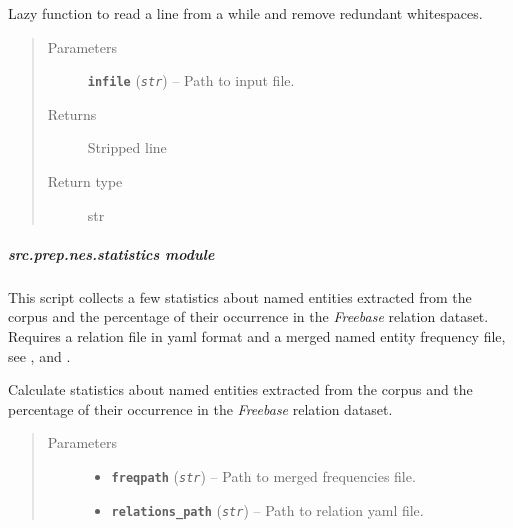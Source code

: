 \documentclass[letterpaper,10pt,english]{sphinxmanual}
\begin{document}

\begin{fulllineitems}
\label{src.prep.nes:src.prep.nes.merge.rl}
Lazy function to read a line from a while and remove redundant whitespaces.
\begin{quote}\begin{description}
\item[{Parameters}] \leavevmode
\textbf{\texttt{infile}} (\emph{\texttt{str}}) -- Path to input file.

\item[{Returns}] \leavevmode
Stripped line

\item[{Return type}] \leavevmode
str

\end{description}\end{quote}

\end{fulllineitems}



\subparagraph{src.prep.nes.statistics module}
\label{src.prep.nes:src-prep-nes-statistics-module}\label{src.prep.nes:module-src.prep.nes.statistics}
This script collects a few statistics about named entities extracted from the corpus and the percentage of their
occurrence in the \emph{Freebase} relation dataset.
Requires a relation file in yaml format and a merged named entity frequency file, see ,
 and  .

\begin{fulllineitems}
\label{src.prep.nes:src.prep.nes.statistics.calculate_occurrences}
Calculate statistics about named entities extracted from the corpus and the percentage of their
occurrence in the \emph{Freebase} relation dataset.
\begin{quote}\begin{description}
\item[{Parameters}] \leavevmode\begin{itemize}
\item {} 
\textbf{\texttt{freqpath}} (\emph{\texttt{str}}) -- Path to merged frequencies file.

\item {} 
\textbf{\texttt{relations\_path}} (\emph{\texttt{str}}) -- Path to relation yaml file.

\end{itemize}

\end{description}\end{quote}

\end{fulllineitems}
\end{document}
